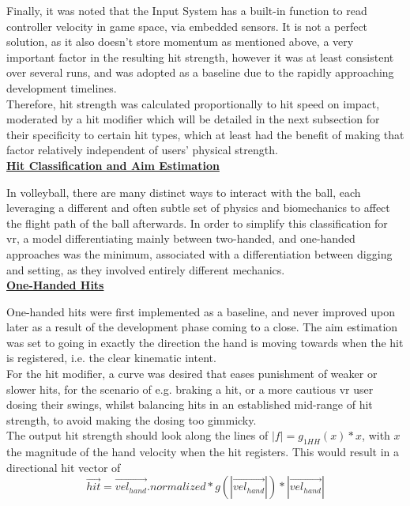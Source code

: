 Finally, it was noted that the Input System has a built-in function to read controller velocity in game space, via embedded sensors. It is not a perfect solution, as it also doesn't store momentum as mentioned above, a very important factor in the resulting hit strength, however it was at least consistent over several runs, and was adopted as a baseline due to the rapidly approaching development timelines.\\

Therefore, hit strength was calculated proportionally to hit speed on impact, moderated by a hit modifier which will be detailed in the next subsection for their specificity to certain hit types, which at least had the benefit of making that factor relatively independent of users' physical strength.\\

\noindent\textbf{\underline{Hit Classification and Aim Estimation}}

In volleyball, there are many distinct ways to interact with the ball, each leveraging a different and often subtle set of physics and biomechanics to affect the flight path of the ball afterwards. In order to simplify this classification for \gls{vr}, a model differentiating mainly between two-handed, and one-handed approaches was the minimum, associated with a differentiation between digging and setting, as they involved entirely different mechanics.\\

\textbf{\underline{One-Handed Hits}}

One-handed hits were first implemented as a baseline, and never improved upon later as a result of the development phase coming to a close. The aim estimation was set to going in exactly the direction the hand is moving towards when the hit is registered, i.e. the clear kinematic intent.\\
For the hit modifier, a curve was desired that eases punishment of weaker or slower hits, for the scenario of e.g. braking a hit, or a more cautious \gls{vr} user dosing their swings, whilst balancing hits in an established mid-range of hit strength, to avoid making the dosing too gimmicky.\\
The output hit strength should look along the lines of $|f| = g_{1HH}(x) * x$, with $x$ the magnitude of the hand velocity when the hit registers. This would result in a directional hit vector of \[\overrightarrow{hit} = \overrightarrow{vel_{hand}}.normalized * g(|\overrightarrow{vel_{hand}}|)*|\overrightarrow{vel_{hand}}|\]

